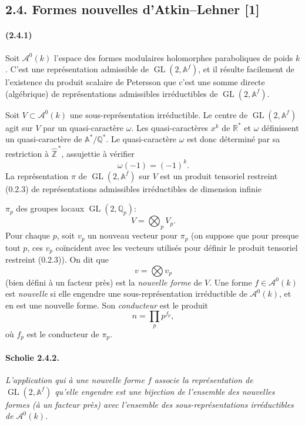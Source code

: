 \documentclass[10pt,a4paper]{article}
\providecommand{\GL}{\operatorname{GL}}
\providecommand{\R}{\mathbb R}
\providecommand{\Q}{\mathbb Q}
\providecommand{\Z}{\mathbb Z}
\providecommand{\A}{\mathbb A}
\providecommand{\Af}{\mathbb A^f}
\begin{document}
\subsection*{2.4. Formes nouvelles d'Atkin--Lehner [1]}

\paragraph{(2.4.1)} Soit \(\mathcal A^0(k)\) l'espace des formes modulaires holomorphes paraboliques de poids \(k\). C'est une représentation admissible de \(\GL(2,\Af)\), et il résulte facilement de l'existence du produit scalaire de Petersson que c'est une somme directe (algébrique) de représentations admissibles irréductibles de \(\GL(2,\Af)\).

Soit \(V\subset \mathcal A^0(k)\) une sous-représentation irréductible. Le centre de \(\GL(2,\Af)\) agit sur \(V\) par un quasi-caractère \(\omega\). Les quasi-caractères \(x^k\) de \(\R^*\) et \(\omega\) définissent un quasi-caractère de \(\A^*/\Q^*\). Le quasi-caractère \(\omega\) est donc déterminé par sa restriction à \(\widehat{\Z}^{\,*}\), assujettie à vérifier
\[
\omega(-1)=(-1)^k.
\]
La représentation \(\pi\) de \(\GL(2,\Af)\) sur \(V\) est un produit tensoriel restreint (0.2.3) de représentations admissibles irréductibles de dimension infinie

\clearpage
{}
\hypertarget{authority-31}{}
\(\pi_p\) des groupes locaux \(\GL(2,\Q_p)\):
\[
V=\bigotimes_p V_p.
\]
Pour chaque \(p\), soit \(v_p\) un nouveau vecteur pour \(\pi_p\) (on suppose que pour presque tout \(p\), ces \(v_p\) coïncident avec les vecteurs utilisés pour définir le produit tensoriel restreint (0.2.3)). On dit que
\[
v=\bigotimes v_p
\]
(bien défini à un facteur près) est la \emph{nouvelle forme} de \(V\). Une forme \(f\in \mathcal A^0(k)\) est \emph{nouvelle} si elle engendre une sous-représentation irréductible de \(\mathcal A^0(k)\), et en est une nouvelle forme. Son \emph{conducteur} est le produit
\[
n=\prod_p p^{f_p},
\]
où \(f_p\) est le conducteur de \(\pi_p\).

\paragraph{Scholie 2.4.2.}{\itshape  L'application qui à une nouvelle forme \(f\) associe la représentation de \(\GL(2,\Af)\) qu'elle engendre est une bijection de l'ensemble des nouvelles formes (à un facteur près) avec l'ensemble des sous-représentations irréductibles de \(\mathcal A^0(k)\).\par}
\end{document}
